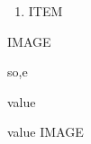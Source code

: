 \documentclass{article}
\begin{document}
\noindent\begin{minipage}[t]{0.5\linewidth}
\begin{enumerate}
    \item ITEM
\end{enumerate}
\end{minipage}\hfill
\begin{minipage}[t]{0.5\linewidth}
IMAGE
\end{minipage}
so,e

\begin{enumext}[mini-env=0.6\linewidth, columns=2,noitemsep]
    \item value \item value
    \miniright
    IMAGE
\end{enumext}
\end{document}
